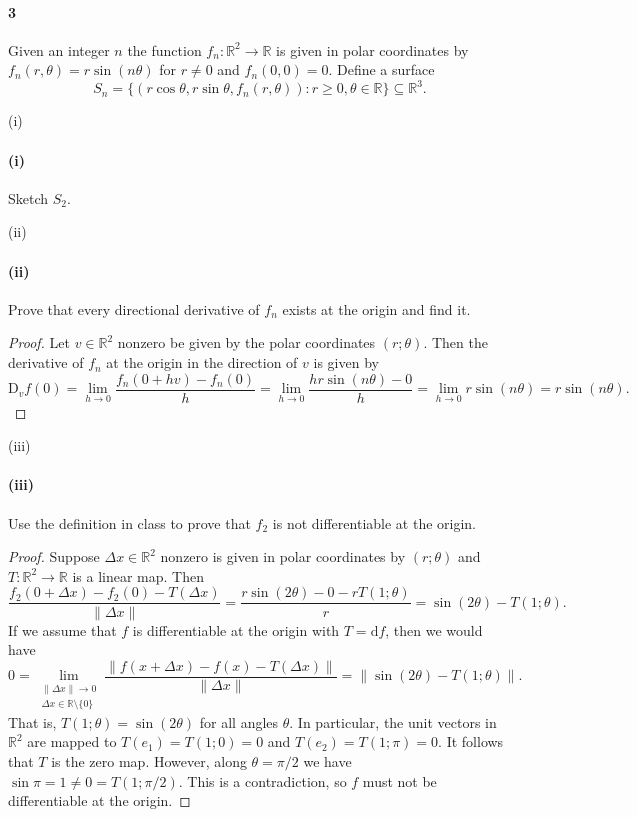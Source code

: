 \documentclass[12pt]{article}
\newlength{\myparskip}
\newenvironment{fullbox}{\begin{lrbox}{\savefullbox}\begin{minipage}{\dimexpr\textwidth-2\fboxsep\relax}\setlength{\parskip}{\myparskip}}{\end{minipage}\end{lrbox}\framebox[\textwidth]{\usebox{\savefullbox}}}
\newenvironment{pbox}[1][]{\begin{fullbox}\ifx#1\empty\else\paragraph{#1}\phantom{}\fi}{\end{fullbox}}
\theoremstyle{definition}
\newcommand{\R}{\mathbb{R}}
\newcommand{\<}{\langle}
\renewcommand{\>}{\rangle}
\newcommand{\seq}{\subseteq}
\newcommand{\dd}{\mathrm{d}}
\newcommand{\DD}{\mathrm{D}}
\begin{document}
\begin{pbox}[3]
    Given an integer $n$ the function $f_n : \R^2 \to \R$ is given in polar coordinates by $f_n(r, \theta) = r \sin(n\theta)$ for $r \ne 0$ and $f_n(0, 0) = 0$.
    Define a surface
    \[
        S_n = \{(r \cos\theta, r \sin\theta, f_n(r, \theta)) : r \geq 0, \theta \in \R\} \seq \R^3.
    \]
\end{pbox}

\begin{pbox}[(i)]
    Sketch $S_2$.
\end{pbox}

\newpage
\begin{pbox}[(ii)]
    Prove that every directional derivative of $f_n$ exists at the origin and find it.
\end{pbox}

\begin{proof}
    Let $v \in \R^2$ nonzero be given by the polar coordinates $(r; \theta)$.
    Then the derivative of $f_n$ at the origin in the direction of $v$ is given by
    \[
        \DD_v f(0)
            = \lim_{h \to 0} \frac{f_n(0 + hv) - f_n(0)}{h}
            = \lim_{h \to 0} \frac{hr\sin(n\theta) - 0}{h}
            = \lim_{h \to 0} r\sin(n\theta)
            = r\sin(n\theta).
    \]
\end{proof}

\begin{pbox}[(iii)]
    Use the definition in class to prove that $f_2$ is not differentiable at the origin.
\end{pbox}

\begin{proof}
    Suppose $\Delta x \in \R^2$ nonzero is given in polar coordinates by $(r; \theta)$ and $T : \R^2 \to \R$ is a linear map.
    Then
    \[
        \frac{f_2(0 + \Delta x) - f_2(0) - T(\Delta x)}{\|\Delta x\|}
            = \frac{r\sin(2\theta) - 0 - rT(1; \theta)}{r}
            = \sin(2\theta) - T(1; \theta).
    \]
    If we assume that $f$ is differentiable at the origin with $T = \dd{f}$, then we would have
    \[
        0
            = \lim_{\substack{\|\Delta x\| \to 0 \\ \Delta x \in \R \setminus \{0\}}} \frac{\|f(x + \Delta x) - f(x)  - T(\Delta x)\|}{\|\Delta x\|}
            = \|\sin(2\theta) - T(1; \theta)\|.
    \]
    That is, $T(1; \theta) = \sin(2\theta)$ for all angles $\theta$.
    In particular, the unit vectors in $\R^2$ are mapped to $T(e_1) = T(1; 0) = 0 $ and $T(e_2) = T(1; \pi) = 0$.
    It follows that $T$ is the zero map.
    However, along $\theta = \pi/2$ we have $\sin\pi = 1 \ne 0 = T(1; \pi/2)$.
    This is a contradiction, so $f$ must not be differentiable at the origin.
\end{proof}
\end{document}

